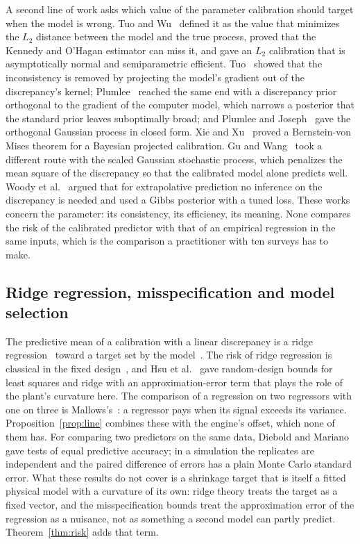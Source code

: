 A second line of work asks which value of the parameter calibration should target when the model is wrong. Tuo and
Wu~\cite{tuowu} defined it as the value that minimizes the $L_2$ distance between the model and the true process, proved that
the Kennedy and O'Hagan estimator can miss it, and gave an $L_2$ calibration that is asymptotically normal and semiparametric
efficient. Tuo~\cite{tuo} showed that the inconsistency is removed by projecting the model's gradient out of the discrepancy's
kernel; Plumlee~\cite{plumlee} reached the same end with a discrepancy prior orthogonal to the gradient of the computer
model, which narrows a posterior that the standard prior leaves suboptimally broad; and Plumlee and Joseph~\cite{plumleejoseph}
gave the orthogonal Gaussian process in closed form. Xie and Xu~\cite{xiexu} proved a Bernstein-von Mises theorem for a
Bayesian projected calibration. Gu and Wang~\cite{guwang} took a different route with the scaled Gaussian stochastic process,
which penalizes the mean square of the discrepancy so that the calibrated model alone predicts well. Woody et al.~\cite{woody}
argued that for extrapolative prediction no inference on the discrepancy is needed and used a Gibbs posterior with a tuned
loss. These works concern the parameter: its consistency, its efficiency, its meaning. None compares the risk of the
calibrated predictor with that of an empirical regression in the same inputs, which is the comparison a practitioner with ten
surveys has to make.

\subsection{Ridge regression, misspecification and model selection}

The predictive mean of a calibration with a linear discrepancy is a ridge regression~\cite{hoerl} toward a target set by the
model~\cite{cb002}. The risk of ridge regression is classical in the fixed design~\cite{hastie}, and Hsu et al.~\cite{hsu} gave
random-design bounds for least squares and ridge with an approximation-error term that plays the role of the plant's curvature
here. The comparison of a regression on two regressors with one on three is Mallows's~\cite{mallows}: a regressor pays when
its signal exceeds its variance. Proposition~\ref{prop:line} combines these with the engine's offset, which none of them has.
For comparing two predictors on the same data, Diebold and Mariano~\cite{diebold} gave tests of equal predictive accuracy; in
a simulation the replicates are independent and the paired difference of errors has a plain Monte Carlo standard error. What
these results do not cover is a shrinkage target that is itself a fitted physical model with a curvature of its own: ridge
theory treats the target as a fixed vector, and the misspecification bounds treat the approximation error of the regression as
a nuisance, not as something a second model can partly predict. Theorem~\ref{thm:risk} adds that term.


